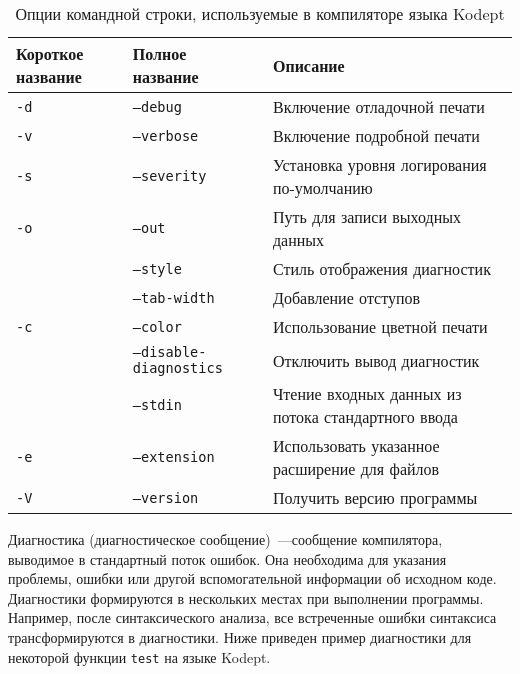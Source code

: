 \begin{table}[H]
    \centering
    \caption{Опции командной строки, используемые в компиляторе языка Kodept}
    \label{tab:flags}
    \begin{tabular}{|p{25mm}|p{}|p{}|}
        \hline
        \textbf{Короткое название} & \textbf{Полное название}       & \textbf{Описание}                                  \\\hline
        \texttt{-d}                & \texttt{--debug}               & Включение отладочной печати                        \\\hline
        \texttt{-v}                & \texttt{--verbose}             & Включение подробной печати                         \\\hline
        \texttt{-s}                & \texttt{--severity}            & Установка уровня логирования по-умолчанию          \\\hline
        \texttt{-o}                & \texttt{--out}                 & Путь для записи выходных данных                    \\\hline
        & \texttt{--style}               & Стиль отображения диагностик                       \\\hline
        & \texttt{--tab-width}           & Добавление отступов                                \\\hline
        \texttt{-c}                & \texttt{--color}               & Использование цветной печати                       \\\hline
        & \texttt{--disable-diagnostics} & Отключить вывод диагностик                         \\\hline
        & \texttt{--stdin}               & Чтение входных данных из потока стандартного ввода \\\hline
        \texttt{-e}                & \texttt{--extension}           & Использовать указанное расширение для файлов       \\\hline
        \texttt{-V}                & \texttt{--version}             & Получить версию программы                          \\\hline
    \end{tabular}
\end{table}

Диагностика (диагностическое сообщение)~---сообщение компилятора, выводимое в стандартный поток ошибок.
Она необходима для указания проблемы, ошибки или другой вспомогательной информации об исходном коде.
Диагностики формируются в нескольких местах при выполнении программы.
Например, после синтаксического анализа, все встреченные ошибки синтаксиса трансформируются в диагностики.
Ниже приведен пример диагностики для некоторой функции \lstinline{test} на языке Kodept.

